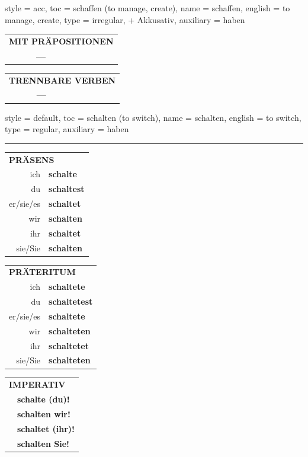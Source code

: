 \begin{verbentry}{
  style = {acc},
  toc = {schaffen (to manage, create)},
  name = {schaffen},
  english = {to manage, create},
  type = {irregular, + Akkusativ},
  auxiliary = {haben}
}
  
\vspace{10pt}

\begin{tabular}{lll}
\multicolumn{3}{l}{\textbf{MIT PRÄPOSITIONEN}}\\
& \textbf{---} & \\
\end{tabular}
\hfill
\begin{tabular}{lll}
\multicolumn{3}{l}{\textbf{TRENNBARE VERBEN}}\\
& \textbf{---} & \\
\end{tabular}
\vspace{-5pt}
\end{verbentry}

\begin{verbentry}{
  style = {default},
  toc = {schalten (to switch)},
  name = {schalten},
  english = {to switch},
  type = {regular},
  auxiliary = {haben}
}
 

\vspace{5pt}
\hrule
\vspace{5pt}

\begin{tabular}{rl}
\multicolumn{2}{l}{\textbf{PRÄSENS}}\\
ich & \textbf{schalte}\\
du & \textbf{schaltest}\\
er/sie/es & \textbf{schaltet}\\
wir & \textbf{schalten}\\
ihr & \textbf{schaltet}\\
sie/Sie & \textbf{schalten}\\
\end{tabular}
\hfill
\begin{tabular}{rl}
\multicolumn{2}{l}{\textbf{PRÄTERITUM}}\\
ich & \textbf{schaltete}\\
du & \textbf{schaltetest}\\
er/sie/es & \textbf{schaltete}\\
wir & \textbf{schalteten}\\
ihr & \textbf{schaltetet}\\
sie/Sie & \textbf{schalteten}\\
\end{tabular}
\hfill
\begin{tabular}{rl}
\multicolumn{2}{l}{\textbf{IMPERATIV}}\\
& \textbf{schalte (du)!}\\
& \textbf{schalten wir!}\\
& \textbf{schaltet (ihr)!}\\
& \textbf{schalten Sie!}\\
\end{tabular}


\end{verbentry}
